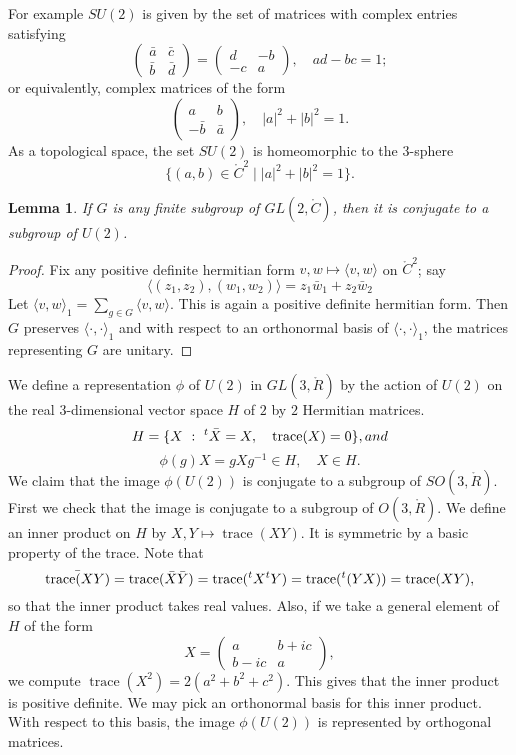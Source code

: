 \documentclass{amsart}
\newtheorem{lemma}[equation]{Lemma}
\def\t#1{\hbox{}^t#1}
\def\op#1{{\operatorname{#1}}}
\def\CC{\ring{C}}
\def\RR{\ring{R}}
\begin{document}
For example $SU(2)$ is given by the set of matrices with complex entries satisfying
\[
\begin{pmatrix}{\bar a} & {\bar c} \\ \bar b & \bar d\end{pmatrix} = 
\begin{pmatrix}d & - b\\ -c & a \end{pmatrix},\quad ad - bc = 1;
\]
or equivalently, complex matrices of the form
\[
\begin{pmatrix}a & b\\ -\bar b & \bar a\end{pmatrix},\quad |a|^2 + |b|^2 = 1.
\]
As a topological space, the set $SU(2)$ is homeomorphic to
 the $3$-sphere 
$$\{(a,b)\in \CC^2\mid |a|^2 + |b|^2 = 1\}.$$


\begin{lemma} If $G$ is any finite subgroup of $GL(2,\CC)$, then it is
conjugate to a subgroup of $U(2)$.
\end{lemma}

\begin{proof} Fix any positive definite hermitian form $v,w\mapsto \langle v,w\rangle $ on $\CC^2$;
say 
\[\langle (z_1,z_2),(w_1,w_2)\rangle  = z_1 \bar w_1 + z_2 \bar w_2\]
Let $\langle v,w\rangle_1 = \sum_{g\in G} \langle v,w\rangle$.  This is again a positive definite
hermitian form.    Then $G$ preserves $\langle\cdot,\cdot\rangle_1$ and with respect 
to an orthonormal basis  of $\langle\cdot,\cdot\rangle_1$, the matrices representing $G$ are unitary.
\end{proof}

We define a representation $\phi$ of $U(2)$ in $GL(3,\RR)$ by the action of $U(2)$ on the real $3$-dimensional
 vector space $H$
of $2$ by $2$ Hermitian matrices.
\[
H = \{ X \mid \t{\bar X} = X,\quad \op{trace}(X)=0\}, and 
\]
  \[
   \phi(g) X = {g} X g^{-1} \in H, \quad X\in H.
  \]
We claim that the image $\phi(U(2))$ is conjugate to a subgroup of  $SO(3,\RR)$.
First we check that the image is conjugate to a subgroup of $O(3,\RR)$.  We define an inner product
on $H$ by  $X,Y\mapsto \op{trace}(XY)$.  It is symmetric by a basic property of the trace.  Note that 
\[
\bar {\op{trace}(XY)} = \op{trace}(\bar X \bar Y) = \op{trace}(\t{X}\t{Y}) = \op{trace}(\t{(YX)}) = \op{trace}(XY),
\]
so that the inner product takes real values.
Also, if we take a general element of $H$ of the form
\[
X = \begin{pmatrix} a & b + i c \\ b - i c & a\end{pmatrix},
\]
we compute $\op{trace}(X^2) = 2 (a^2 + b^2 + c^2)$.  This gives that the inner product is positive definite.  We may
pick an orthonormal basis for this inner product.  With respect to this basis, the image $\phi(U(2))$
is represented by orthogonal matrices.
\end{document}
